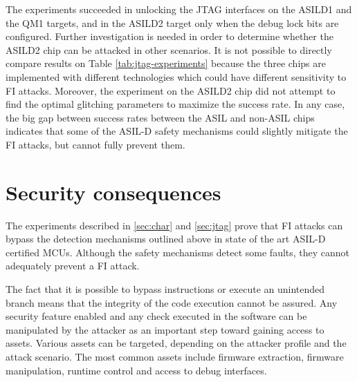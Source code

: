 \documentclass[a4paper, 10pt]{IEEEtran}
\newcommand{\TI}{ASILD1\xspace}
\newcommand{\ST}{ASILD2\xspace}
\newcommand{\NXP}{QM1\xspace}
\begin{document}
The experiments succeeded in unlocking the JTAG interfaces on the \TI and the \NXP targets, and in the \ST target only when the debug lock bits are configured. Further investigation is needed in order to determine whether the \ST chip can be attacked in other scenarios.
It is not possible to directly compare results on Table \ref{tab:jtag-experiments} because the three chips are implemented with different technologies which could have different sensitivity to FI attacks. Moreover, the experiment on the \ST chip did not attempt to find the optimal glitching parameters to maximize the success rate. In any case, the big gap between success rates between the ASIL and non-ASIL chips indicates that some of the ASIL-D safety mechanisms could slightly mitigate the FI attacks, but cannot fully prevent them.



\section{Security consequences}

The experiments described in \autoref{sec:char} and \autoref{sec:jtag} prove that FI attacks can bypass the detection mechanisms outlined above in state of the art ASIL-D certified MCUs. Although the safety mechanisms detect some faults, they cannot adequately prevent a FI attack.

The fact that it is possible to bypass instructions or execute an unintended branch means that the integrity of the code execution cannot be assured. Any security feature enabled and any check executed in the software can be manipulated by the attacker as an important step toward gaining access to assets. Various assets can be targeted, depending on the attacker profile and the attack scenario. The most common assets include firmware extraction, firmware manipulation, runtime control and access to debug interfaces.
\end{document}
